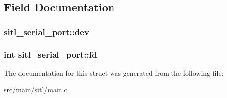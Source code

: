 \subsection{Field Documentation}
\hypertarget{structsitl__serial__port_a864b43d6af43ceabb6d9ce88c0ec369e}{
\subsubsection[{dev}]{ sitl\+\_\+serial\+\_\+port\+::dev}}\label{structsitl__serial__port_a864b43d6af43ceabb6d9ce88c0ec369e}
\hypertarget{structsitl__serial__port_a6359b0a0389d0352e566b93f6b2b6c59}{
\subsubsection[{fd}]{\setlength{\rightskip}{0pt plus 5cm}int sitl\+\_\+serial\+\_\+port\+::fd}}\label{structsitl__serial__port_a6359b0a0389d0352e566b93f6b2b6c59}


The documentation for this struct was generated from the following file\+:\begin{DoxyCompactItemize}
\item 
src/main/sitl/\hyperlink{sitl_2main_8c}{main.\+c}\end{DoxyCompactItemize}
